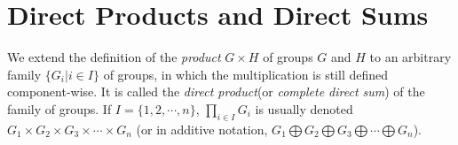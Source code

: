 \section{Direct Products and Direct Sums}
\begin{Definition}
	We extend the definition of the \textit{product} $ G \times H $ of groups $ G $ and $ H $ to an arbitrary family $ \{G_i| i\in I \} $ of groups, in which the multiplication is still defined component-wise. It is called the \textit{direct product}(or \textit{complete direct sum}) of the family of groups. If $ I=\{1,2,\cdots,n \} $, $ \prod_{i\in I}G_i $ is usually denoted $ G_1 \times G_2 \times G_3 \times \cdots \times G_n$ (or in additive notation, $ G_1 \bigoplus G_2 \bigoplus G_3 \bigoplus \cdots \bigoplus G_n$).
\end{Definition}

